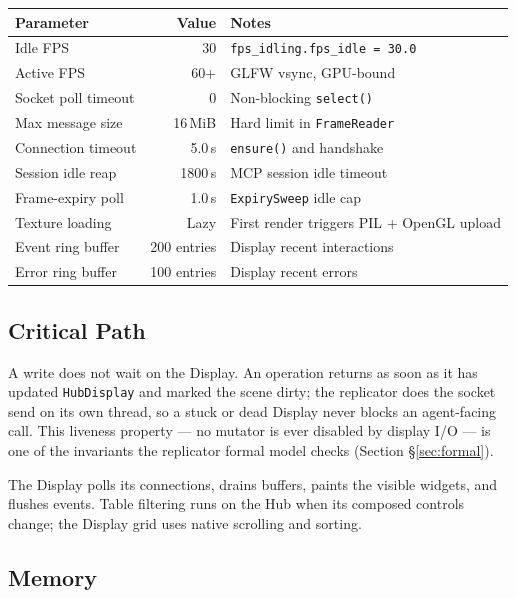 \documentclass[a4paper,10pt]{article}
\begin{document}
\begin{center}
\begin{tabular}{lrl}
\toprule
\textbf{Parameter} & \textbf{Value} & \textbf{Notes} \\
\midrule
Idle FPS            & 30             & \texttt{fps\_idling.fps\_idle = 30.0} \\
Active FPS          & 60+            & GLFW vsync, GPU-bound \\
Socket poll timeout & 0              & Non-blocking \texttt{select()} \\
Max message size    & 16\,MiB        & Hard limit in \texttt{FrameReader} \\
Connection timeout  & 5.0\,s         & \texttt{ensure()} and handshake \\
Session idle reap   & 1800\,s        & MCP session idle timeout \\
Frame-expiry poll   & 1.0\,s         & \texttt{ExpirySweep} idle cap \\
Texture loading     & Lazy           & First render triggers PIL + OpenGL upload \\
Event ring buffer   & 200 entries    & Display recent interactions \\
Error ring buffer   & 100 entries    & Display recent errors \\
\bottomrule
\end{tabular}
\end{center}

\subsection{Critical Path}

A write does not wait on the Display.  An operation returns as soon as it
has updated \texttt{HubDisplay} and marked the scene dirty; the replicator
does the socket send on its own thread, so a stuck or dead Display never
blocks an agent-facing call.  This liveness property --- no mutator is ever
disabled by display I/O --- is one of the invariants the replicator formal
model checks (Section \S\ref{sec:formal}).

The Display polls its connections, drains buffers, paints the visible
widgets, and flushes events. Table filtering runs on the Hub when its
composed controls change; the Display grid uses native scrolling and sorting.

\subsection{Memory}
\end{document}
